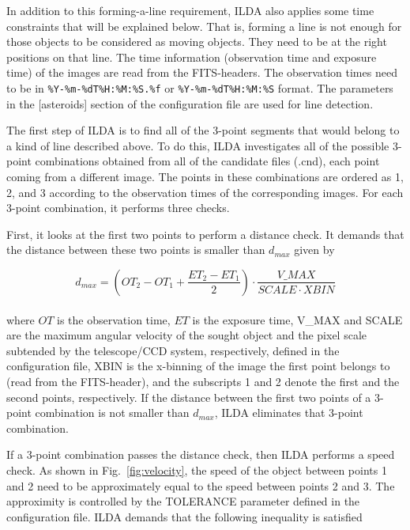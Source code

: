\documentclass[review]{elsarticle}
\begin{document}
In addition to this forming-a-line requirement, ILDA also applies some time constraints that will be explained below. That is, forming a line is not enough for those objects to be considered as moving objects. They need to be at the right positions on that line. The time information (observation time and exposure time) of the images are read from the FITS-headers. The observation times need to be in \verb;%Y-%m-%dT%H:%M:%S.%f; or \verb;%Y-%m-%dT%H:%M:%S; format. The parameters in the [asteroids] section of the configuration file are used for line detection.

The first step of ILDA is to find all of the 3-point segments that would belong to a kind of line described above. To do this, ILDA investigates all of the possible 3-point combinations obtained from all of the candidate files (.cnd), each point coming from a different image. The points in these combinations are ordered as 1, 2, and 3 according to the observation times of the corresponding images. For each 3-point combination, it performs three checks.

First, it looks at the first two points to perform a distance check. It demands that the distance between these two points is smaller than $d_{max}$ given by

\begin{equation}
        d_{max} = \left( OT_2 - OT_1 + \frac {ET_2 - ET_1} {2} \right) \cdot \frac {V\_MAX} {SCALE \cdot XBIN}
\end{equation}
\\
\noindent
where $OT$ is the observation time, $ET$ is the exposure time, V\_MAX and SCALE are the maximum angular velocity of the sought object and the pixel scale subtended by the telescope/CCD system, respectively, defined in the configuration file, XBIN is the x-binning of the image the first point belongs to (read from the FITS-header), and the subscripts 1 and 2 denote the first and the second points, respectively. If the distance between the first two points of a 3-point combination is not smaller than $d_{max}$, ILDA eliminates that 3-point combination.

If a 3-point combination passes the distance check, then ILDA performs a speed check. As shown in Fig.~\ref{fig:velocity}, the speed of the object between points 1 and 2 need to be approximately equal to the speed between points 2 and 3. The approximity is controlled by the TOLERANCE parameter defined in the configuration file. ILDA demands that the following inequality is satisfied
\end{document}
